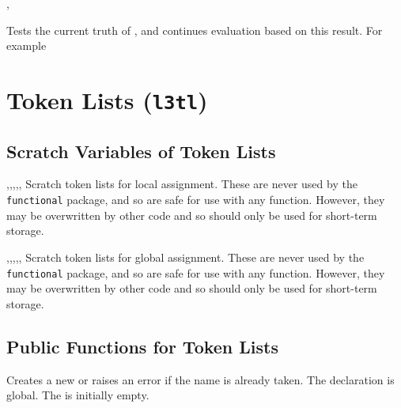 \documentclass[oneside]{book}
\begin{document}
\begin{function}{\BoolIf,\BoolIfTF}
\begin{syntax}
 
   
\end{syntax}
Tests the current truth of , and continues evaluation
based on this result. For example
\begin{demo}
\BoolSetTrue\lTmpaBool
\BoolIfTF{}
\BoolSetFalse\lTmpaBool
\BoolIfTF{}
\end{demo}
\end{function}

\chapter{Token Lists (\texttt{l3tl})}

\section{Scratch Variables of Token Lists}

\begin{variable}{\lTmpaTl,\lTmpbTl,\lTmpcTl,\lTmpiTl,\lTmpjTl,\lTmpkTl}
Scratch token lists for local assignment. These are never used by
the \verb!functional! package, and so are safe for use with any
function. However, they may be overwritten by other
code and so should only be used for short-term storage.
\end{variable}

\begin{variable}{\gTmpaTl,\gTmpbTl,\gTmpcTl,\gTmpiTl,\gTmpjTl,\gTmpkTl}
Scratch token lists for global assignment. These are never used by
the \verb!functional! package, and so are safe for use with any
function. However, they may be overwritten by other
code and so should only be used for short-term storage.
\end{variable}

\section{Public Functions for Token Lists}

\begin{function}{\TlNew}
\begin{syntax}
 
\end{syntax}
Creates a new  or raises an error if the
name is already taken. The declaration is global. The
 is initially empty.
\end{function}
\end{document}
